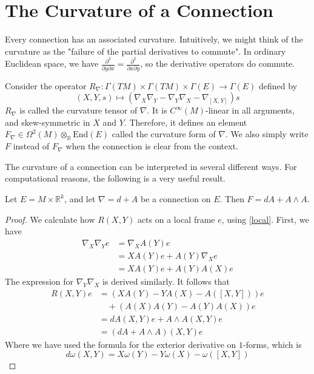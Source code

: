 \section{The Curvature of a Connection}

Every connection has an associated curvature. Intuitively, we might think of the curvature as the "failure of the partial derivatives to commute". In ordinary Euclidean space, we have $\frac{\partial^2}{\partial y\partial x}=\frac{\partial^2}{\partial x\partial y}$, so the derivative operators do commute.
\begin{definition}
  Consider the operator $R_\nabla:\Gamma(TM)\times\Gamma(TM)\times\Gamma(E)\to\Gamma(E)$ defined by
  $$(X,Y,s)\mapsto(\nabla_X\nabla_Y-\nabla_Y\nabla_X-\nabla_{[X,Y]})s$$
  $R_\nabla$ is called the curvature tensor of $\nabla$. It is $C^\infty(M)$-linear in all arguments, and skew-symmetric in $X$ and $Y$. Therefore, it defines an element $F_\nabla\in\Omega^2(M)\otimes_\mathbb{R}\text{End}(E)$ called the curvature form of $\nabla$. We also simply write $F$ instead of $F_\nabla$ when the connection is clear from the context.
\end{definition}
The curvature of a connection can be interpreted in several different ways. For computational reasons, the following is a very useful result.
\begin{theorem}\label{cartan}
  Let $E=M\times\mathbb{R}^k$, and let $\nabla=d+A$ be a connection on $E$. Then $F=dA+A\wedge A$.
\end{theorem}
\begin{proof}
  We calculate how $R(X,Y)$ acts on a local frame $e$, using \ref{local}. First, we have
  \begin{align*}
    \nabla_X\nabla_Ye &=\nabla_XA(Y)e \\
                      &=XA(Y)e+A(Y)\nabla_Xe \\
                      &=XA(Y)e+A(Y)A(X)e
  \end{align*}
  The expression for $\nabla_Y\nabla_X$ is derived similarly. It follows that
  \begin{align*}
    R(X,Y)e &= (XA(Y)-YA(X)-A([X,Y]))e \\
            &\quad +(A(X)A(Y)-A(Y)A(X))e\\ 
            &= dA(X,Y)e+A\wedge A(X,Y)e \\
            &= (dA+A\wedge A)(X,Y)e
  \end{align*}
  Where we have used the formula for the exterior derivative on $1$-forms, which is $$d\omega(X,Y)=X\omega(Y)-Y\omega(X)-\omega([X,Y])$$
\end{proof}
